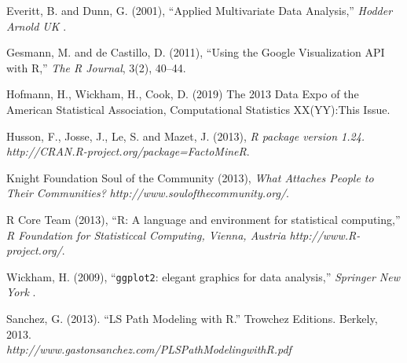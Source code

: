 \documentclass[11pt]{asaproc}
\begin{document}

\begin{references}
\itemsep=0pt
{\footnotesize
\item
Everitt, B. and Dunn, G. (2001), ``Applied Multivariate Data Analysis,''  {\it Hodder Arnold UK }.

\item 
Gesmann, M. and de Castillo, D. (2011), ``Using the Google
Visualization API with R,'' {\it The R Journal}, 3(2), 40--44.

\item
Hofmann, H., Wickham, H., Cook, D. (2019) The 2013 Data Expo of the American Statistical Association, Computational Statistics XX(YY):This Issue.

\item 
Husson, F., Josse, J., Le, S. and Mazet, J. (2013), {\it R package
  version 1.24. http://CRAN.R-project.org/package=FactoMineR}.

\item 
Knight Foundation Soul of the Community (2013), 
{\it What Attaches People to Their Communities?}
 {\it http://www.soulofthecommunity.org/}.

\item 
R Core Team (2013), ``R: A language and environment for statistical
computing,'' {\it R Foundation for Statisticcal Computing, Vienna,
  Austria http://www.R-project.org/}.

\item 
Wickham, H. (2009), ``\texttt{ggplot2}: elegant graphics for data
analysis,''  {\it Springer New York }.

\item
Sanchez, G. (2013). ``LS Path Modeling with R.'' Trowchez
Editions. Berkely, 2013. \\
{\it http://www.gastonsanchez.com/PLSPathModelingwithR.pdf} 

}
\end{references}
\end{document}
